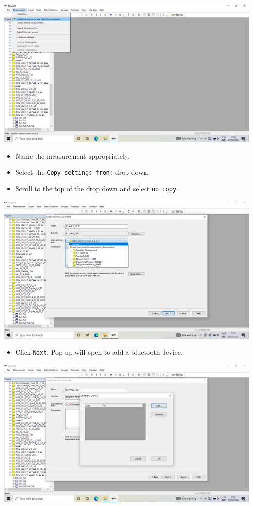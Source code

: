 \documentclass[
]{book}
\providecommand{\tightlist}{%
  \setlength{\itemsep}{0pt}\setlength{\parskip}{0pt}}
\begin{document}
\includegraphics[width=1\linewidth]{images/startnewmeasurement/04_select_start_new}

\begin{itemize}
\tightlist
\item
  Name the measurement appropriately.
\item
  Select the \texttt{Copy\ settings\ from:} drop down.
\item
  Scroll to the top of the drop down and select \texttt{no\ copy}.
\end{itemize}

\includegraphics[width=1\linewidth]{images/startnewmeasurement/05_copy_no_settings}

\begin{itemize}
\tightlist
\item
  Click \texttt{Next}. Pop up will open to add a bluetooth device.
\end{itemize}

\includegraphics[width=1\linewidth]{images/startnewmeasurement/06_add_device}
\end{document}
